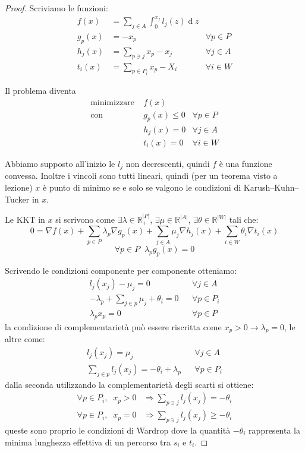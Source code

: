 \documentclass[a4paper]{article}
\theoremstyle{plain}
\theoremstyle{definition}
\theoremstyle{remark}
\newcommand{\abs}[1]{\left|#1\right|}
\DeclareMathOperator{\de}{d}
\begin{document}
\begin{proof}
  Scriviamo le funzioni:
  \begin{align*}
    f(x) &= \sum _{j\in A} \int _0 ^ {x_j} l_j(z)\de z \\
    g_p(x) &= -x_p & \forall p\in P \\
    h_j(x) &= \sum _{p\ni j} x_p -x_j & \forall j\in A\\
    t_i(x) &= \sum _{p\in P_i} x_p - X_i & \forall i\in W
  \end{align*}
  
  Il problema diventa
  \begin{align*}
    \text{minimizzare} \;&  f(x) \\
    \text{con} \;& g_p(x) \le 0 &\forall p \in P \\
                         & h_j(x) = 0 & \forall j\in A\\
                         & t_i(x) = 0 & \forall i\in W
  \end{align*}

  Abbiamo supposto all'inizio le $l_j$ non decrescenti, quindi $f$ è
  una funzione convessa. Inoltre i vincoli sono tutti lineari, quindi
  (per un teorema visto a lezione) $x$ è punto di minimo se e solo se
  valgono le condizioni di Karush–Kuhn–Tucker in $x$.

  Le KKT in $x$ si scrivono come $\exists \lambda \in \mathbb{R}_+^{\abs{P}}$,
  $\exists \mu \in \mathbb{R}^{\abs{A}}$,
  $\exists \theta \in \mathbb{R}^{\abs{W}}$ tali che:
  \[ 0 = \nabla f(x) + \sum_{p\in P}\lambda _p \nabla g_p(x) + \sum _{j\in
      A} \mu _j \nabla h_j(x) + \sum _{i\in W} \theta _i \nabla t_i(x) \]
  \[ \forall p\in P\;\; \lambda _p g_p(x) = 0 \]
  
  Scrivendo le condizioni componente per componente otteniamo:
  \begin{align*}
    l_j(x_j) - \mu _j =0 && \forall j\in A \\
    -\lambda _p + \sum _{j\in p}\mu _j + \theta _i =0 && \forall p \in
                                                      P _i \\
    \lambda _p x_p =0 && \forall p\in P
  \end{align*}
  la condizione di complementarietà può essere riscritta come $x_p > 0
  \rightarrow \lambda _p =0$, le altre come:
  \begin{align*}
    l_j(x_j) = \mu _j && \forall j\in A \\
    \sum _{j\in p}l_j(x_j) = -\theta _i + \lambda _p && \forall p \in
                                                      P _i
  \end{align*}
  dalla seconda utilizzando la complementarietà degli scarti si
  ottiene:
  \begin{align*}
    \forall p\in P_i,\;\; x_p > 0 & \Rightarrow \sum _{p\ni j} l_j(x_j) = -\theta _i \\
    \forall p\in P_i,\;\; x_p = 0 & \Rightarrow \sum _{p\ni j} l_j(x_j) \ge -\theta _i
  \end{align*}
  queste sono proprio le condizioni di Wardrop dove la quantità
  $-\theta _i$ rappresenta la minima lunghezza effettiva di un
  percorso tra $s_i$ e $t_i$.
\end{proof}
\end{document}
